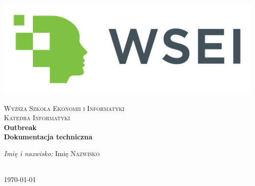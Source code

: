 \begin{titlepage}

    \begin{center}
    
    \includegraphics[scale=0.08]{Images/logo_wsei.jpg}
    
    \textsc{Wyższa Szkoła Ekonomii i Informatyki}\\[0.2cm]
    \vspace{2cm}
    \textsc{Katedra Informatyki}\\[1cm]
    
    {\huge \bfseries Outbreak}\\[1cm]
    
    \textbf{Dokumentacja techniczna}\\[1cm]
    
    \vfill
    
    \begin{minipage}{0.8\textwidth}
    \begin{flushleft}
    {\large \emph{Imię i nazwisko:} } { \hfill Imię  \textsc{Nazwisko}} \newline
    \end{flushleft}
    \end{minipage}\\[2cm]
    
    \large{\today}
    
    \end{center}
    
    \end{titlepage}
    
